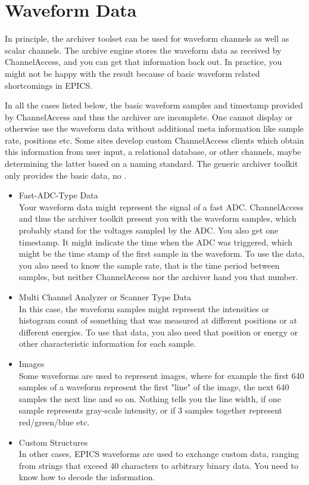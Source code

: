 \section{Waveform Data} \label{sec:waveforms}
In principle, the archiver toolset can be used for waveform channels
as well as scalar channels.
The archive engine stores the waveform data as received by ChannelAccess,
and you can get that information back out.
In practice, you might not be happy with the result because of basic
waveform related shortcomings in EPICS.

In all the cases listed below, the basic waveform samples and timestamp
provided by ChannelAccess and thus the archiver are incomplete.
One cannot display or otherwise use the waveform data without
additional meta information like sample rate, positions etc.
Some sites develop custom ChannelAccess clients which obtain this
information from user input, a relational database,
or other channels, maybe determining the latter based on a naming standard.
The generic archiver toolkit only provides the basic data, no
.

\begin{itemize}
\item Fast-ADC-Type Data\\
Your waveform data might represent the signal of a fast ADC.
ChannelAccess and thus the archiver toolkit present you with
the waveform samples, which probably stand for the voltages
sampled by the ADC. You also get one timestamp. It might indicate
the time when the ADC was triggered, which might be the time stamp
of the first sample in the waveform.
To use the data, you also need to know the sample rate,
that is the time period between samples, but neither ChannelAccess
nor the archiver hand you that number.

\item Multi Channel Analyzer or Scanner Type Data\\
In this case, the waveform samples might represent the intensities
or histogram count of something that was measured at different
positions or at different energies.
To use that data, you also need that position or energy or other
characteristic information for each sample.

\item Images\\
Some waveforms are used to represent images, where for example
the first 640 samples of a waveform represent the first "line"
of the image, the next 640 samples the next line and so on.
Nothing tells you the line width, if one sample represents
gray-scale intensity, or if 3 samples together represent red/green/blue
etc.

\item Custom Structures\\
In other cases, EPICS waveforms are used to exchange custom data,
ranging from strings that exceed 40 characters to arbitrary
binary data. You need to know how to decode the information.
\end{itemize}
